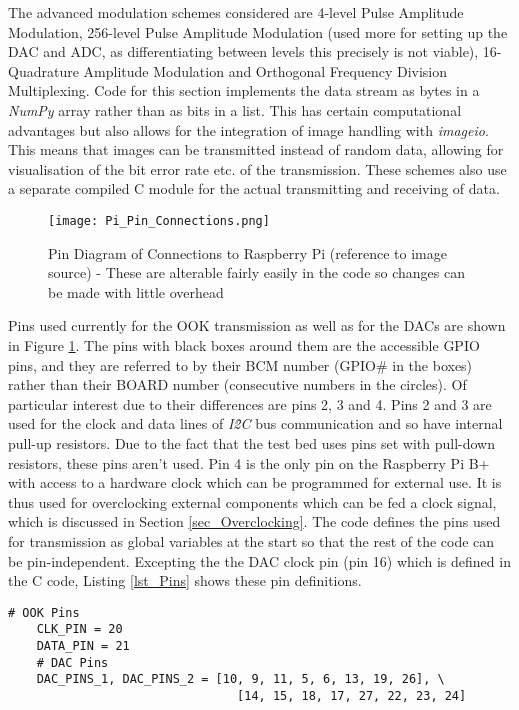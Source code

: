 \documentclass[../main.tex]{subfiles}
\begin{document}
The advanced modulation schemes considered are 4-level Pulse Amplitude Modulation, 256-level Pulse Amplitude Modulation (used more for setting up the DAC and ADC, as differentiating between levels this precisely is not viable), 16-Quadrature Amplitude Modulation and Orthogonal Frequency Division Multiplexing.
Code for this section implements the data stream as bytes in a \textit{NumPy} array rather than as bits in a list.
This has certain computational advantages but also allows for the integration of image handling with \textit{imageio}.
This means that images can be transmitted instead of random data, allowing for visualisation of the bit error rate etc. of the transmission.
These schemes also use a separate compiled C module for the actual transmitting and receiving of data.\\

\begin{figure}[ht]
	\centering
	\texttt{[image: Pi\_Pin\_Connections.png]}
	\caption{Pin Diagram of Connections to Raspberry Pi (reference to image source) - These are alterable fairly easily in the code so changes can be made with little overhead}
	\label{fig_Pin Connections}
\end{figure}

Pins used currently for the OOK transmission as well as for the DACs are shown in Figure \ref{fig_Pin Connections}.
The pins with black boxes around them are the accessible GPIO pins, and they are referred to by their BCM number (GPIO\# in the boxes) rather than their BOARD number (consecutive numbers in the circles).
Of particular interest due to their differences are pins 2, 3 and 4.
Pins 2 and 3 are used for the clock and data lines of \textit{I\^2C} bus communication and so have internal pull-up resistors.
Due to the fact that the test bed uses pins set with pull-down resistors, these pins aren't used.
Pin 4 is the only pin on the Raspberry Pi B+ with access to a hardware clock which can be programmed for external use.
It is thus used for overclocking external components which can be fed a clock signal, which is discussed in Section \ref{sec_Overclocking}.
The code defines the pins used for transmission as global variables at the start so that the rest of the code can be pin-independent.
Excepting the the DAC clock pin (pin 16) which is defined in the C code, Listing \ref{lst_Pins} shows these pin definitions.\\

\begin{lstlisting}[caption={Pins used for OOK and the DACs}, label={lst_Pins}]
	# OOK Pins
	CLK_PIN = 20
	DATA_PIN = 21
	# DAC Pins
	DAC_PINS_1, DAC_PINS_2 = [10, 9, 11, 5, 6, 13, 19, 26], \
								[14, 15, 18, 17, 27, 22, 23, 24]
\end{lstlisting} 
\end{document}
